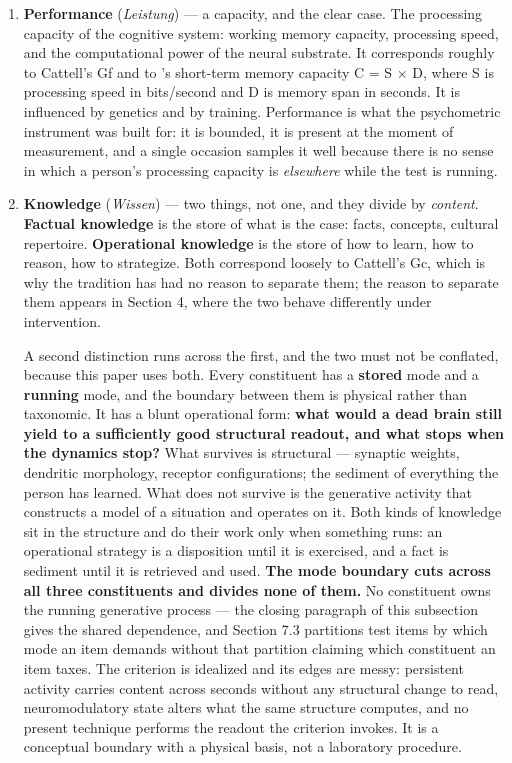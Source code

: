\documentclass[12pt,a4paper]{article}
\begin{document}
\begin{enumerate}

\item \textbf{Performance} (\emph{Leistung}) ---\hspace{0pt} a capacity, and the clear case. The processing capacity of the cognitive system: working memory capacity, processing speed, and the computational power of the neural substrate. It corresponds roughly to Cattell's Gf and to \citeauthor{Frank1962}'s \citeyearpar{Frank1962} short-term memory capacity C = S $\times$ D, where S is processing speed in bits/second and D is memory span in seconds. It is influenced by genetics and by training. Performance is what the psychometric instrument was built for: it is bounded, it is present at the moment of measurement, and a single occasion samples it well because there is no sense in which a person's processing capacity is \emph{elsewhere} while the test is running.

\item \textbf{Knowledge} (\emph{Wissen}) ---\hspace{0pt} two things, not one, and they divide by \emph{content}. \textbf{Factual knowledge} is the store of what is the case: facts, concepts, cultural repertoire. \textbf{Operational knowledge} is the store of how to learn, how to reason, how to strategize. Both correspond loosely to Cattell's Gc, which is why the tradition has had no reason to separate them; the reason to separate them appears in Section 4, where the two behave differently under intervention.

A second distinction runs across the first, and the two must not be conflated, because this paper uses both. Every constituent has a \textbf{stored} mode and a \textbf{running} mode, and the boundary between them is physical rather than taxonomic. It has a blunt operational form: \textbf{what would a dead brain still yield to a sufficiently good structural readout, and what stops when the dynamics stop?} What survives is structural ---\hspace{0pt} synaptic weights, dendritic morphology, receptor configurations; the sediment of everything the person has learned. What does not survive is the generative activity that constructs a model of a situation and operates on it. Both kinds of knowledge sit in the structure and do their work only when something runs: an operational strategy is a disposition until it is exercised, and a fact is sediment until it is retrieved and used. \textbf{The mode boundary cuts across all three constituents and divides none of them.} No constituent owns the running generative process ---\hspace{0pt} the closing paragraph of this subsection gives the shared dependence, and Section 7.3 partitions test items by which mode an item demands without that partition claiming which constituent an item taxes. The criterion is idealized and its edges are messy: persistent activity carries content across seconds without any structural change to read, neuromodulatory state alters what the same structure computes, and no present technique performs the readout the criterion invokes. It is a conceptual boundary with a physical basis, not a laboratory procedure.


\end{enumerate}
\end{document}
